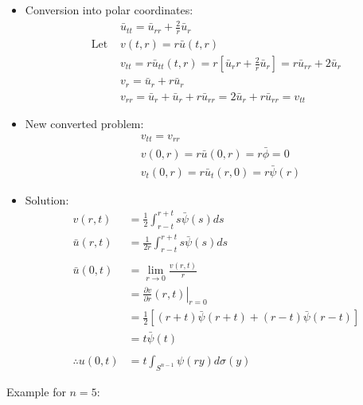 \documentclass[12pt, a4paper]{article}
\begin{document}
\begin{itemize}
    \item Conversion into polar coordinates:
    \begin{align*}
        &\bar{u}_{tt} = \bar{u}_{rr} + \frac{2}{r}\bar{u}_r\\
        \text{Let }&v(t, r) = r\bar{u}(t, r)\\
        &v_{tt} = r\bar{u}_{tt}(t, r) = r[\bar{u}_rr+\frac{2}{r}\bar{u}_r]=r\bar{u}_{rr}+2\bar{u}_r\\
        &v_r = \bar{u}_r + r\bar{u}_r\\
        &v_{rr} = \bar{u}_r + \bar{u}_r + r\bar{u}_{rr} = 2\bar{u}_r + r\bar{u}_{rr} = v_{tt}
    \end{align*}
    \item New converted problem:
    \begin{align*}
        &v_{tt}=v_{rr}\\
        &v(0, r) = r\bar{u}(0, r) = r\bar{\phi} = 0\\
        &v_t(0, r) = r\bar{u}_t(r, 0) = r\bar{\psi}(r)
    \end{align*}
    \item Solution:
    \begin{align*}
        v(r, t) &= \frac{1}{2}\int_{r-t}^{r+t}s\bar{\psi}(s)ds\\
        \bar{u}(r, t) &= \frac{1}{2r}\int_{r-t}^{r+t}s\bar{\psi}(s)ds\\\\
        \bar{u}(0, t) &= \lim_{r\to 0}\frac{v(r, t)}{r}\\
        &=\left.\frac{\partial v}{\partial r}(r, t)\right\rvert_{r=0}\\
        &=\frac{1}{2}[(r+t)\bar{\psi}(r+t)+(r-t)\bar{\psi}(r-t)]\\
        &=t\bar{\psi}(t)\\\\
        \therefore u(0, t) &= t\int_{S^{n-1}}\psi(ry)d\sigma(y)
    \end{align*}
\end{itemize}
Example for $n=5$:
\end{document}

